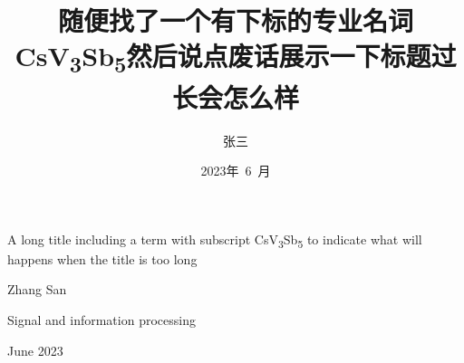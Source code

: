 \title{
    随便找了一个有下标的专业名词CsV\textsubscript{3}Sb\textsubscript{5}然后说点废话展示一下标题过长会怎么样
}{
    A long title including a term with subscript CsV\textsubscript{3}Sb\textsubscript{5} to indicate what will happens when the title is too long
}
\author{张三}{Zhang San}
\subject{信号与信息处理}{Signal and information processing}
\date{2023年~6~月}{June 2023}
\makeCover